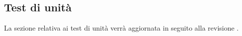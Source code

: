 \subsection{Test di unità}

\par La sezione relativa ai test di unità verrà aggiornata in seguito alla revisione .